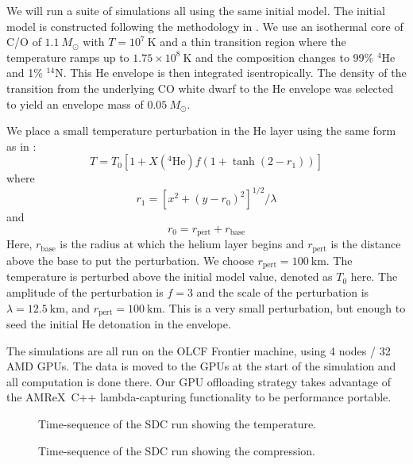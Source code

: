 \documentclass[modern]{aastex631}
\newcommand{\isot}[2]{$^{#2}\mathrm{#1}$}
\newcommand{\isotm}[2]{{}^{#2}\mathrm{#1}}
\newcommand{\amrex}{{\sf AMReX}}
\begin{document}
We will run a suite of simulations all using the same initial model.
The initial model is constructed following the methodology in
\citet{subchandra}.  We use an isothermal core of C/O of $1.1~M_\odot$
with $T = 10^7~\mathrm{K}$ and a thin transition region where the
temperature ramps up to $1.75\times 10^8~\mathrm{K}$ and the
composition changes to 99\% \isot{He}{4} and 1\% \isot{N}{14}.    This He envelope is then integrated isentropically.  The
density of the transition from the underlying CO white dwarf to the He
envelope was selected to yield an envelope mass of $0.05~M_\odot$.

We place a small temperature perturbation in the He layer using the
same form as in \citet{castro_simple_sdc}:
\begin{equation}
  T = T_0 \left [ 1 + X(\isotm{He}{4}) f (1 + \tanh(2 - r_1)) \right ]
\end{equation}
where
\begin{equation}
  r_1 = \left [ x^2 + (y - r_0)^2 \right ]^{1/2} / \lambda
\end{equation}
and
\begin{equation}
  r_0 = r_\mathrm{pert} + r_\mathrm{base}
\end{equation}
Here, $r_\mathrm{base}$ is the radius at which the helium layer begins
and $r_\mathrm{pert}$ is the distance above the base to put the
perturbation.  We choose $r_\mathrm{pert} = 100~\mathrm{km}$.  The
temperature is perturbed above the initial model value, denoted as
$T_0$ here.  The amplitude of the perturbation is $f = 3$ and the
scale of the perturbation is $\lambda = 12.5~\mathrm{km}$, and
$r_\mathrm{pert} = 100~\mathrm{km}$.  This is a very small
perturbation, but enough to seed the initial He detonation in the
envelope.



The simulations are all run on the OLCF Frontier machine, using 4
nodes / 32 AMD GPUs.  The data is moved to the GPUs at the start of
the simulation and all computation is done there.  Our GPU offloading
strategy takes advantage of the \amrex\ C++ lambda-capturing
functionality to be performance portable.

\begin{figure*}[t]
\centering
{}
\caption{\label{fig:temp_sequence} Time-sequence of the SDC run showing the temperature.}
\end{figure*}

\begin{figure*}[t]
\centering
{}
\caption{\label{fig:lap_rho_sequence} Time-sequence of the SDC run showing the compression.}
\end{figure*}
\end{document}
